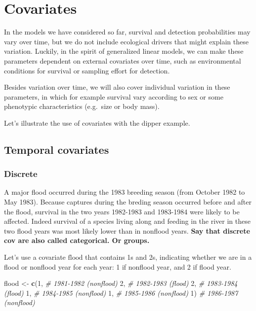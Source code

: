 \documentclass[
  12pt,
]{krantz}
\newenvironment{Shaded}{\begin{snugshade}}{\end{snugshade}}
\newcommand{\CommentTok}[1]{\textcolor[rgb]{0.56,0.35,0.01}{\textit{#1}}}
\newcommand{\DecValTok}[1]{\textcolor[rgb]{0.00,0.00,0.81}{#1}}
\newcommand{\FunctionTok}[1]{\textcolor[rgb]{0.13,0.29,0.53}{\textbf{#1}}}
\newcommand{\NormalTok}[1]{#1}
\newcommand{\OtherTok}[1]{\textcolor[rgb]{0.56,0.35,0.01}{#1}}
\begin{document}
\hypertarget{covariates}{%
\section{Covariates}\label{covariates}}

In the models we have considered so far, survival and detection probabilities may vary over time, but we do not include ecological drivers that might explain these variation. Luckily, in the spirit of generalized linear models, we can make these parameters dependent on external covariates over time, such as environmental conditions for survival or sampling effort for detection.

Besides variation over time, we will also cover individual variation in these parameters, in which for example survival vary according to sex or some phenotypic characteristics (e.g.~size or body mass).

Let's illustrate the use of covariates with the dipper example.

\hypertarget{temporal-covariates}{%
\subsection{Temporal covariates}\label{temporal-covariates}}

\hypertarget{discrete}{%
\subsubsection{Discrete}\label{discrete}}

A major flood occurred during the 1983 breeding season (from October 1982 to May 1983). Because captures during the breding season occurred before and after the flood, survival in the two years 1982-1983 and 1983-1984 were likely to be affected. Indeed survival of a species living along and feeding in the river in these two flood years was most likely lower than in nonflood years. \textbf{Say that discrete cov are also called categorical. Or groups.}

Let's use a covariate \(\text{flood}\) that contains 1s and 2s, indicating whether we are in a flood or nonflood year for each year: 1 if nonflood year, and 2 if flood year.

\begin{Shaded}
\begin{Highlighting}[]
\NormalTok{flood }\OtherTok{\textless{}{-}} \FunctionTok{c}\NormalTok{(}\DecValTok{1}\NormalTok{, }\CommentTok{\# 1981{-}1982 (nonflood)}
           \DecValTok{2}\NormalTok{, }\CommentTok{\# 1982{-}1983 (flood)}
           \DecValTok{2}\NormalTok{, }\CommentTok{\# 1983{-}1984 (flood)}
           \DecValTok{1}\NormalTok{, }\CommentTok{\# 1984{-}1985 (nonflood)}
           \DecValTok{1}\NormalTok{, }\CommentTok{\# 1985{-}1986 (nonflood)}
           \DecValTok{1}\NormalTok{) }\CommentTok{\# 1986{-}1987 (nonflood)}
\end{Highlighting}
\end{Shaded}
\end{document}

